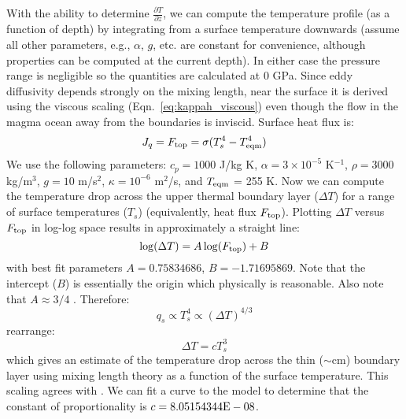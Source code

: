 With the ability to determine $\frac{\partial T}{\partial z}$, we can compute the temperature profile (as a function of depth) by integrating from a surface temperature  downwards (assume all other parameters, e.g., $\alpha$, $g$, etc. are constant for convenience, although properties can be computed at the current depth).  In either case the pressure range is negligible so the quantities are calculated at 0 GPa.  Since eddy diffusivity depends strongly on the mixing length, near the surface it is derived using the viscous scaling (Eqn.~\ref{eq:kappah_viscous}) even though the flow in the magma ocean away from the boundaries is inviscid.  Surface heat flux is:
\begin{equation}
J_q = F_{\rm top} = \sigma (T_s^4 - T_{\rm eqm}^4)
\end{equation}
We use the following parameters: $c_p=1000$ J/kg K, $\alpha=3 \times 10^{-5}$ K$^{-1}$, $\rho=3000$ kg/m$^3$, $g=10$ m/s$^2$, $\kappa=10^{-6}$ m$^2$/s, and $T_{\rm eqm}$ = 255 K.  Now we can compute the temperature drop across the upper thermal boundary layer ($\Delta T$) for a range of surface temperatures ($T_s$) (equivalently, heat flux $F_{\rm top}$).  Plotting $\Delta T$ versus $F_{\rm top}$ in log-log space results in approximately a straight line:
\begin{equation}
\log(\Delta T) = A \log( F_{\rm top} ) + B
\end{equation}
with best fit parameters $A=0.75834686$, $B=-1.71695869$.  Note that the intercept ($B$) is essentially the origin which physically is reasonable.  Also note that $A \approx 3/4$ .  Therefore:
\begin{equation}
q_s \propto T_s^4 \propto (\Delta T)^{4/3}
\end{equation}
rearrange:
\begin{equation}
\Delta T = c T_s^3
\end{equation}
which gives an estimate of the temperature drop across the thin ($\sim$cm) boundary layer using mixing length theory as a function of the surface temperature.  This scaling agrees with \cite{RS06} .  We can fit a curve to the model to determine that the constant of proportionality is $c=8.05154344{\rm E-08}$.  
